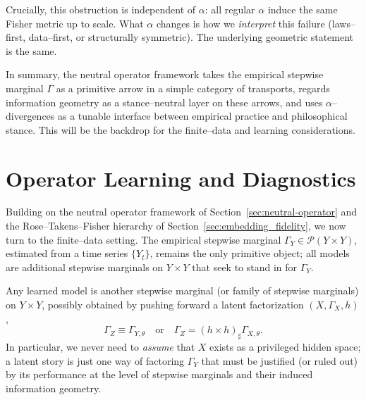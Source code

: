 \documentclass[11pt]{article}
\newcommand{\1}{\mathbf{1}}
\begin{document}
Crucially, this obstruction is independent of \(\alpha\): all regular \(\alpha\) induce the same Fisher metric up to scale. What \(\alpha\) changes is how we \emph{interpret} this failure (laws–first, data–first, or structurally symmetric). The underlying geometric statement is the same.

\medskip

In summary, the neutral operator framework takes the empirical stepwise marginal \(\Gamma\) as a primitive arrow in a simple category of transports, regards information geometry as a stance–neutral layer on these arrows, and uses \(\alpha\)–divergences as a tunable interface between empirical practice and philosophical stance. This will be the backdrop for the finite–data and learning considerations.

\newpage


\section{Operator Learning and Diagnostics}
\label{sec:operator-learning}

Building on the neutral operator framework of Section~\ref{sec:neutral-operator} and the Rose--Takens--Fisher hierarchy of Section~\ref{sec:embedding_fidelity}, we now turn to the finite–data setting. The empirical stepwise marginal \(\Gamma_Y \in \mathcal{P}(Y \times Y)\), estimated from a time series \(\{Y_t\}\), remains the only primitive object; all models are additional stepwise marginals on \(Y \times Y\) that seek to stand in for \(\Gamma_Y\).

Any learned model is another stepwise marginal (or family of stepwise marginals) on \(Y\times Y\), possibly obtained by pushing forward a latent factorization \((X,\Gamma_X,h)\),
\[
  \Gamma_Z \equiv \Gamma_{Y,\theta}
  \quad\text{or}\quad
  \Gamma_Z = (h\times h)_\sharp \Gamma_{X,\theta}.
\]
In particular, we never need to \emph{assume} that \(X\) exists as a privileged hidden space; a latent story is just one way of factoring \(\Gamma_Y\) that must be justified (or ruled out) by its performance at the level of stepwise marginals and their induced information geometry.
\end{document}

